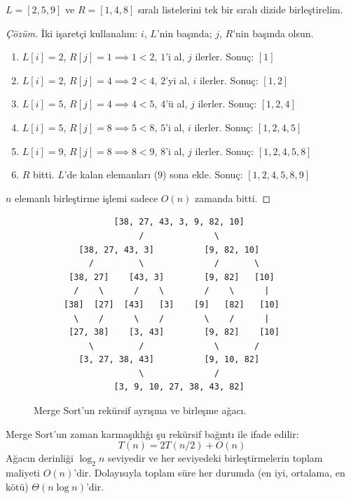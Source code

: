 \begin{example}
$L = [2, 5, 9]$ ve $R = [1, 4, 8]$ sıralı listelerini tek bir sıralı dizide birleştirelim.
\end{example}

\begin{proof}[Çözüm]
İki işaretçi kullanalım: $i$, $L$'nin başında; $j$, $R$'nin başında olsun.
\begin{enumerate}
    \item $L[i]=2$, $R[j]=1 \implies 1 < 2$, $1$'i al, $j$ ilerler. Sonuç: $[1]$
    \item $L[i]=2$, $R[j]=4 \implies 2 < 4$, $2$'yi al, $i$ ilerler. Sonuç: $[1, 2]$
    \item $L[i]=5$, $R[j]=4 \implies 4 < 5$, $4$'ü al, $j$ ilerler. Sonuç: $[1, 2, 4]$
    \item $L[i]=5$, $R[j]=8 \implies 5 < 8$, $5$'i al, $i$ ilerler. Sonuç: $[1, 2, 4, 5]$
    \item $L[i]=9$, $R[j]=8 \implies 8 < 9$, $8$'i al, $j$ ilerler. Sonuç: $[1, 2, 4, 5, 8]$
    \item $R$ bitti. $L$'de kalan elemanları ($9$) sona ekle. Sonuç: $[1, 2, 4, 5, 8, 9]$
\end{enumerate}
$n$ elemanlı birleştirme işlemi sadece $O(n)$ zamanda bitti.
\end{proof}

\begin{figure}[htbp]
\centering
\begin{verbatim}
                [38, 27, 43, 3, 9, 82, 10]
                     /              \
         [38, 27, 43, 3]          [9, 82, 10]
           /         \              /       \
       [38, 27]    [43, 3]        [9, 82]   [10]
        /    \      /    \        /    \      |
      [38]  [27]  [43]   [3]    [9]   [82]   [10]
        \    /      \    /        \    /      |
       [27, 38]    [3, 43]        [9, 82]    [10]
           \         /              \       /
         [3, 27, 38, 43]          [9, 10, 82]
                     \              /
                [3, 9, 10, 27, 38, 43, 82]
\end{verbatim}
\caption{Merge Sort'un rekürsif ayrışma ve birleşme ağacı.}
\end{figure}

Merge Sort'un zaman karmaşıklığı şu rekürsif bağıntı ile ifade edilir:
\[
T(n) = 2T(n/2) + O(n)
\]
Ağacın derinliği $\log_2 n$ seviyedir ve her seviyedeki birleştirmelerin toplam maliyeti $O(n)$'dir. Dolayısıyla toplam süre her durumda (en iyi, ortalama, en kötü) $\Theta(n \log n)$'dir.

